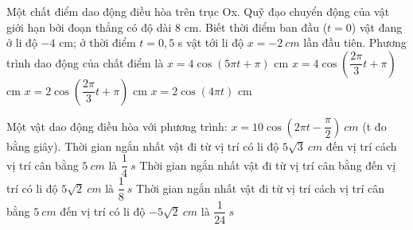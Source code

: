 \begin{ex}%
Một chất điểm dao động điều hòa trên trục Ox. Quỹ đạo chuyển động của vật giới hạn bởi đoạn thẳng có độ dài 8 cm. Biết thời điểm ban đầu ($t = 0$) vật đang ở li độ $-4$ cm; ở thời điểm $t=0,5$ s vật tới li độ $x = -2\ cm$ lần đầu tiên. Phương trình dao động của chất điểm là
\choice 
{$x = 4\cos(5\pi t + \pi)$ cm}
{\True $x = 4\cos(\dfrac{2\pi}{3}t + \pi)$ cm}
{$x = 2\cos(\dfrac{2\pi}{3}t + \pi)$ cm}
{$x = 2\cos(4\pi t)$ cm}
\end{ex} 
\setcounter{ex}{0}
\PhanII
\begin{ex}
Một vật dao động điều hòa với phương trình: $x=10 \cos \left(2 \pi t-\dfrac{\pi}{2}\right)\ cm$ (t đo bằng giây).
{Thời gian ngắn nhất vật đi từ vị trí có li độ $5 \sqrt{3} \ cm$ đến vị trí cách vị trí cân bằng $5 \ cm$ là $\dfrac{1}{4} \ s$}
{\True Thời gian ngắn nhất vật đi từ vị trí cân bằng đến vị trí có li độ $5 \sqrt{2} \ cm$ là $\dfrac{1}{8}\ s$}
{\True Thời gian ngắn nhất vật đi từ vị trí cách vị trí cân bằng $5 \ cm$ đến vị trí có li độ $-5 \sqrt{2} \ cm$ là $\dfrac{1}{24} \ s$}
\loigiai{
\begin{itemchoice}
\itemch
\itemch
\itemch
\itemch
\end{itemchoice}
}
\end{ex} 

